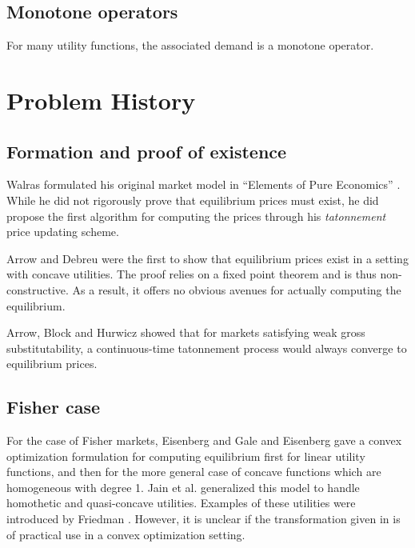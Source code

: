 \documentclass[12pt]{article}
\begin{document}
\subsection{Monotone operators}
For many utility functions, the associated demand is
a monotone operator.


\section{Problem History}
\subsection{Formation and proof of existence}
Walras formulated his original market model in ``Elements of Pure Economics''
\cite{walras1896elements}. While he did not rigorously prove that equilibrium
prices must exist, he did propose the first algorithm for computing the prices
through his \emph{tatonnement} price updating scheme.

Arrow and Debreu \cite{arrow1954existence} were the first to show that
equilibrium prices exist in a setting with concave utilities.
The proof relies on a fixed point theorem and is thus non-constructive.
As a result, it offers no obvious avenues for actually computing the
equilibrium.

Arrow, Block and Hurwicz \cite{arrow1959stability} showed that for markets
satisfying weak gross substitutability, a continuous-time tatonnement process
would always converge to equilibrium prices.


\subsection{Fisher case}
For the case of Fisher markets,
Eisenberg and Gale \cite{eisenberg1959consensus, gale1960theory} and
Eisenberg \cite{eisenberg1961aggregation} gave a convex optimization
formulation for computing equilibrium first for linear utility functions,
and then for the more general case of concave functions which are homogeneous
with degree 1.
Jain et al. \cite{jain2005market} generalized this model to handle homothetic
and quasi-concave utilities.
Examples of these utilities were introduced by Friedman
\cite{friedman1973concavity}.
However, it is unclear if the transformation given in
\cite{jain2005market} is of practical use in a convex optimization setting.
\end{document}
